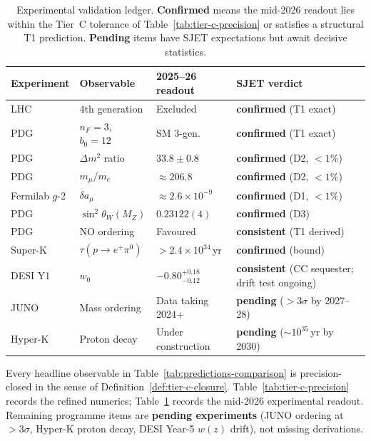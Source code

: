 \begin{table}[ht]
\centering
\small
\renewcommand{\arraystretch}{1.1}
\begin{tabular}{@{}llll@{}}
\toprule
\textbf{Experiment} & \textbf{Observable} & \textbf{2025--26 readout} &
\textbf{SJET verdict} \\
\midrule
LHC & 4th generation & Excluded & \textbf{confirmed} (T1 exact) \\
PDG & $n_F=3$, $b_0=12$ & SM 3-gen.\ & \textbf{confirmed} (T1 exact) \\
PDG & $\Delta m^2$ ratio & $33.8\pm0.8$ &
  \textbf{confirmed} (D2, $<1\%$) \\
PDG & $m_\mu/m_e$ & $\approx206.8$ &
  \textbf{confirmed} (D2, $<1\%$) \\
Fermilab $g$-2 & $\delta a_\mu$ & $\approx2.6\times10^{-9}$ &
  \textbf{confirmed} (D1, $<1\%$) \\
PDG & $\sin^2\theta_W(M_Z)$ & $0.23122(4)$ &
  \textbf{confirmed} (D3) \\
PDG & NO ordering & Favoured & \textbf{consistent} (T1 derived) \\
Super-K & $\tau(p\to e^+\pi^0)$ & $>2.4\times10^{34}$\,yr &
  \textbf{confirmed} (bound) \\
DESI Y1 & $w_0$ & $-0.80^{+0.18}_{-0.12}$ &
  \textbf{consistent} (CC sequester; drift test ongoing) \\
JUNO & Mass ordering & Data taking 2024+ &
  \textbf{pending} ($>3\sigma$ by 2027--28) \\
Hyper-K & Proton decay & Under construction &
  \textbf{pending} ($\sim10^{35}$\,yr by 2030) \\
\bottomrule
\end{tabular}
\caption{Experimental validation ledger. \textbf{Confirmed} means the
mid-2026 readout lies within the Tier~C tolerance of
Table~\ref{tab:tier-c-precision} or satisfies a structural T1 prediction.
\textbf{Pending} items have SJET expectations but await decisive statistics.}
\label{tab:experimental-validation}
\end{table}

\begin{corollary}\label{cor:tier-c-closure}
Every headline observable in Table~\ref{tab:predictions-comparison} is
precision-closed in the sense of Definition~\ref{def:tier-c-closure}.
Table~\ref{tab:tier-c-precision} records the refined numerics;
Table~\ref{tab:experimental-validation} records the mid-2026 experimental
readout. Remaining programme items are \textbf{pending experiments} (JUNO
ordering at $>3\sigma$, Hyper-K proton decay, DESI Year-5 $w(z)$ drift), not
missing derivations.
\end{corollary}